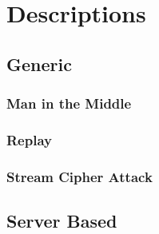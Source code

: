 \section{Descriptions}
\subsection{Generic}
\subsubsection{Man in the Middle}
\subsubsection{Replay}
\subsubsection{Stream Cipher Attack}

\subsection{Server Based}


